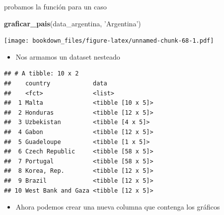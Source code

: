 \documentclass[]{book}
\newenvironment{Shaded}{\begin{snugshade}}{\end{snugshade}}
\newcommand{\DataTypeTok}[1]{\textcolor[rgb]{0.13,0.29,0.53}{#1}}
\newcommand{\DecValTok}[1]{\textcolor[rgb]{0.00,0.00,0.81}{#1}}
\newcommand{\KeywordTok}[1]{\textcolor[rgb]{0.13,0.29,0.53}{\textbf{#1}}}
\newcommand{\NormalTok}[1]{#1}
\newcommand{\OperatorTok}[1]{\textcolor[rgb]{0.81,0.36,0.00}{\textbf{#1}}}
\newcommand{\StringTok}[1]{\textcolor[rgb]{0.31,0.60,0.02}{#1}}
\providecommand{\tightlist}{%
  \setlength{\itemsep}{0pt}\setlength{\parskip}{0pt}}
\begin{document}
probamos la función para un caso

\begin{Shaded}
\begin{Highlighting}[]
\KeywordTok{graficar_pais}\NormalTok{(data_argentina, }\StringTok{'Argentina'}\NormalTok{)}
\end{Highlighting}
\end{Shaded}

\texttt{[image: bookdown\_files/figure-latex/unnamed-chunk-68-1.pdf]}

\begin{itemize}
\tightlist
\item
  Nos armamos un dataset nesteado
\end{itemize}

\begin{Shaded}
\end{Shaded}

\begin{verbatim}
## # A tibble: 10 x 2
##    country            data             
##    <fct>              <list>           
##  1 Malta              <tibble [10 x 5]>
##  2 Honduras           <tibble [12 x 5]>
##  3 Uzbekistan         <tibble [4 x 5]> 
##  4 Gabon              <tibble [12 x 5]>
##  5 Guadeloupe         <tibble [1 x 5]> 
##  6 Czech Republic     <tibble [58 x 5]>
##  7 Portugal           <tibble [58 x 5]>
##  8 Korea, Rep.        <tibble [12 x 5]>
##  9 Brazil             <tibble [12 x 5]>
## 10 West Bank and Gaza <tibble [12 x 5]>
\end{verbatim}

\begin{itemize}
\tightlist
\item
  Ahora podemos crear una nueva columna que contenga los gráficos
\end{itemize}

\begin{Shaded}
\end{Shaded}
\end{document}
